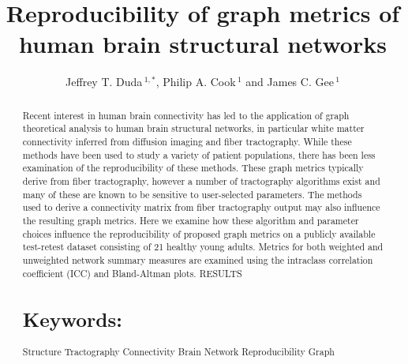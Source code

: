\documentclass{frontiersSCNS} %
\def\journal{Neurosciences}
\def\firstAuthorLast{Duda {et~al}} %
\def\Authors{Jeffrey T. Duda\,$^{1,*}$, Philip A. Cook\,$^{1}$ and James C. Gee\,$^1$}
\begin{document}
\onecolumn
{}

\title[Reproducibility of structural graph metrics]{Reproducibility of graph metrics of human brain structural networks}
\author[\firstAuthorLast ]{\Authors}
\address{}
\correspondance{}
\editor{}

\maketitle
\begin{abstract}

Recent interest in human brain connectivity has led to the application of
graph theoretical analysis to human brain structural networks, in
particular white matter connectivity inferred from diffusion imaging
and fiber tractography. While these methods have been used to study a
variety of patient populations, there has been less examination of the
reproducibility of these methods. These graph metrics typically derive
from fiber tractography, however a number of tractography algorithms
exist and many of these are known to be sensitive to user-selected
parameters. The methods used to derive a connectivity matrix from
fiber tractography output may also influence the resulting graph
metrics. Here we examine how these algorithm and parameter choices
influence the reproducibility of proposed graph metrics on a publicly
available test-retest dataset consisting of 21 healthy young
adults. Metrics for both weighted and unweighted network summary
measures are examined using the intraclass correlation coefficient
(ICC) and Bland-Altman plots. RESULTS



\tiny
  \section{Keywords:} Structure Tractography Connectivity Brain
  Network Reproducibility Graph  %
\end{abstract}
\end{document}
